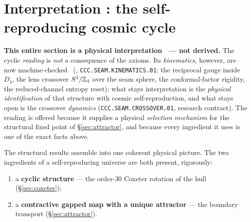 \section{Interpretation \mC: the self-reproducing cosmic cycle}\label{sec:cycle}
\par\smallskip\noindent\textbf{This entire section is a physical interpretation \mC\ --- not derived.}
The cyclic \emph{reading} is \emph{not} a consequence of the axioms.  Its \emph{kinematics}, however, are
now machine-checked \mE\ (, \texttt{CCC.SEAM.KINEMATICS.01}:
the reciprocal gauge inside $D_4$, the lens crossover $S^3/\mathbb Z_4$ over the seam sphere, the
conformal-factor rigidity, the reduced-channel entropy reset); what stays interpretation is the
\emph{physical identification} of that structure with cosmic self-reproduction, and what stays open is
the crossover \emph{dynamics} (\texttt{CCC.SEAM.CROSSOVER.01}, research contract).  The reading is
offered because it supplies a physical \emph{selection mechanism} for the structural fixed point of
\S\ref{sec:attractor}, and because every ingredient it uses is one of the exact facts above.
\par\smallskip

\noindent The structural results assemble into one coherent physical picture. The two ingredients of a
self-reproducing universe are both present, rigorously:
\begin{enumerate}[leftmargin=1.6em]
\item a \textbf{cyclic structure} --- the order-$30$ Coxeter rotation of the hull (\S\ref{sec:coxeter});
\item a \textbf{contractive gapped map with a unique attractor} --- the boundary transport (\S\ref{sec:attractor}).
\end{enumerate}

